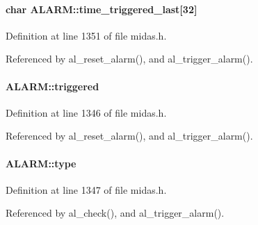 \paragraph[{time\_\-triggered\_\-last}]{\setlength{\rightskip}{0pt plus 5cm}char {\bf ALARM::time\_\-triggered\_\-last}\mbox{[}32\mbox{]}}\hfill\label{structALARM_a23e777e86dfe77137c46fcb31d2537a5}


Definition at line 1351 of file midas.h.

Referenced by al\_\-reset\_\-alarm(), and al\_\-trigger\_\-alarm().
\paragraph[{triggered}]{ {\bf ALARM::triggered}}\hfill\label{structALARM_a5eb18d48345f3193450c95aa6da09122}


Definition at line 1346 of file midas.h.

Referenced by al\_\-reset\_\-alarm(), and al\_\-trigger\_\-alarm().
\paragraph[{type}]{ {\bf ALARM::type}}\hfill\label{structALARM_a0851d9756fd5ee82852d018d0cbd6982}


Definition at line 1347 of file midas.h.

Referenced by al\_\-check(), and al\_\-trigger\_\-alarm().